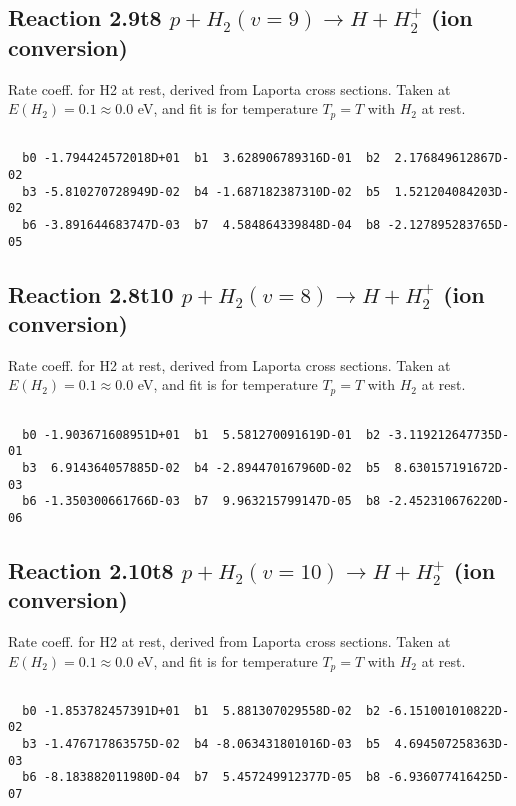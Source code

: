 \documentclass[12pt,dvipdfmx]{article}
\begin{document}
\newpage
\subsection{
Reaction 2.9t8
$ p + H_2(v=9) \rightarrow H + H_2^+$ (ion conversion)
}
Rate coeff. for H2 at rest, derived from Laporta cross sections.
Taken at $E(H_2) = 0.1 \approx 0.0$ eV,  and fit is for temperature $T_p=T$ with $H_2$ at rest.

\begin{small}\begin{verbatim}

  b0 -1.794424572018D+01  b1  3.628906789316D-01  b2  2.176849612867D-02
  b3 -5.810270728949D-02  b4 -1.687182387310D-02  b5  1.521204084203D-02
  b6 -3.891644683747D-03  b7  4.584864339848D-04  b8 -2.127895283765D-05

\end{verbatim}\end{small}

\newpage
\subsection{
Reaction 2.8t10
$ p + H_2(v=8) \rightarrow H + H_2^+$ (ion conversion)
}
Rate coeff. for H2 at rest, derived from Laporta cross sections.
Taken at $E(H_2) = 0.1 \approx 0.0$ eV,  and fit is for temperature $T_p=T$ with $H_2$ at rest.

\begin{small}\begin{verbatim}

  b0 -1.903671608951D+01  b1  5.581270091619D-01  b2 -3.119212647735D-01
  b3  6.914364057885D-02  b4 -2.894470167960D-02  b5  8.630157191672D-03
  b6 -1.350300661766D-03  b7  9.963215799147D-05  b8 -2.452310676220D-06

\end{verbatim}\end{small}

\newpage
\subsection{
Reaction 2.10t8
$ p + H_2(v=10) \rightarrow H + H_2^+$ (ion conversion)
}
Rate coeff. for H2 at rest, derived from Laporta cross sections.
Taken at $E(H_2) = 0.1 \approx 0.0$ eV,  and fit is for temperature $T_p=T$ with $H_2$ at rest.

\begin{small}\begin{verbatim}

  b0 -1.853782457391D+01  b1  5.881307029558D-02  b2 -6.151001010822D-02
  b3 -1.476717863575D-02  b4 -8.063431801016D-03  b5  4.694507258363D-03
  b6 -8.183882011980D-04  b7  5.457249912377D-05  b8 -6.936077416425D-07

\end{verbatim}\end{small}
\end{document}
